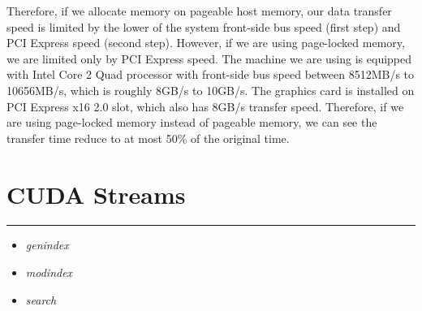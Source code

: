 \documentclass[letterpaper,10pt,english]{sphinxmanual}
\begin{document}
Therefore, if we allocate memory on pageable host memory, our data transfer speed is limited by the lower of the system front-side bus speed (first step) and PCI Express speed (second step). However, if we are using page-locked memory, we are limited only by PCI Express speed. The machine we are using is equipped with Intel Core 2 Quad processor with front-side bus speed between 8512MB/s to 10656MB/s, which is roughly 8GB/s to 10GB/s. The graphics card is installed on PCI Express x16 2.0 slot, which also has 8GB/s transfer speed. Therefore, if we are using page-locked memory instead of pageable memory, we can see the transfer time reduce to at most 50\% of the original time.


\section{CUDA Streams}
\label{Streams/Streams:cuda-streams}

\bigskip\hrule{}\bigskip

\begin{itemize}
\item {} 
\emph{genindex}

\item {} 
\emph{modindex}

\item {} 
\emph{search}

\end{itemize}



\renewcommand{\indexname}{Index}
\printindex
\end{document}
